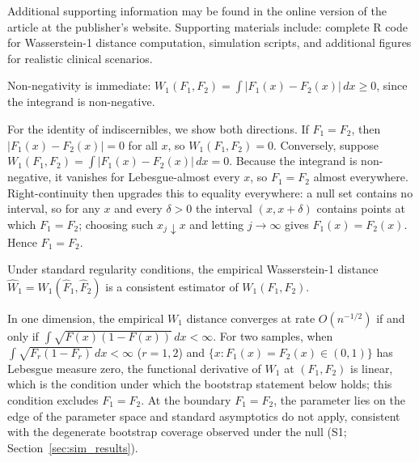 \documentclass[AMA,Times1COL]{WileyNJDv5}
\begin{document}



Additional supporting information may be found in the online version of the article at the publisher's website. Supporting materials include: complete R code for Wasserstein-1 distance computation, simulation scripts, and additional figures for realistic clinical scenarios.

\appendix



Non-negativity is immediate: $W_1(F_1, F_2) = \int |F_1(x) - F_2(x)| \, dx \geq 0$, since the integrand is non-negative.

For the identity of indiscernibles, we show both directions. If $F_1 = F_2$, then $|F_1(x) - F_2(x)| = 0$ for all $x$, so $W_1(F_1, F_2) = 0$. Conversely, suppose $W_1(F_1, F_2) = \int |F_1(x) - F_2(x)| \, dx = 0$. Because the integrand is non-negative, it vanishes for Lebesgue-almost every $x$, so $F_1 = F_2$ almost everywhere. Right-continuity then upgrades this to equality everywhere: a null set contains no interval, so for any $x$ and every $\delta > 0$ the interval $(x, x + \delta)$ contains points at which $F_1 = F_2$; choosing such $x_j \downarrow x$ and letting $j \to \infty$ gives $F_1(x) = F_2(x)$. Hence $F_1 = F_2$.


Under standard regularity conditions, the empirical Wasserstein-1 distance $\widehat{W}_1 = W_1(\hat{F}_1, \hat{F}_2)$ is a consistent estimator of $W_1(F_1, F_2)$.\cite{delbarrio1999}

In one dimension, the empirical $W_1$ distance converges at rate $O(n^{-1/2})$ if and only if $\int \sqrt{F(x)(1-F(x))}\,dx < \infty$.\cite{delbarrio1999} For two samples, when $\int \sqrt{F_r(1-F_r)}\,dx < \infty$ ($r = 1, 2$) and $\{x : F_1(x) = F_2(x) \in (0,1)\}$ has Lebesgue measure zero, the functional derivative of $W_1$ at $(F_1, F_2)$ is linear, which is the condition under which the bootstrap statement below holds; this condition excludes $F_1 = F_2$. At the boundary $F_1 = F_2$, the parameter lies on the edge of the parameter space and standard asymptotics do not apply, consistent with the degenerate bootstrap coverage observed under the null (S1; Section~\ref{sec:sim_results}).
\end{document}
